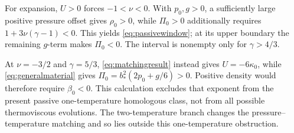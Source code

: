 \documentclass[11pt,a4paper]{article}
\theoremstyle{remark}\newtheorem{remark}{Remark}
\numberwithin{equation}{section}
\begin{document}
For expansion, $U>0$ forces $-1<\nu<0$. With $p_0,g>0$, a sufficiently large positive pressure offset gives $\rho_0>0$, while $\Pi_0>0$ additionally requires $1+3\nu(\gamma-1)<0$. This yields \eqref{eq:passivewindow}; at its upper boundary the remaining $g$-term makes $\Pi_0<0$. The interval is nonempty only for $\gamma>4/3$.

At $\nu=-3/2$ and $\gamma=5/3$, \eqref{eq:matchingresult} instead gives $U=-6\kappa_0$, while \eqref{eq:generalmaterial} gives $\Pi_0=b_*^2(2p_0+g/6)>0$. Positive density would therefore require $\beta_0<0$. This calculation excludes that exponent from the present passive one-temperature homologous class, not from all possible thermoviscous evolutions. The two-temperature branch changes the pressure--temperature matching and so lies outside this one-temperature obstruction.
\end{document}
